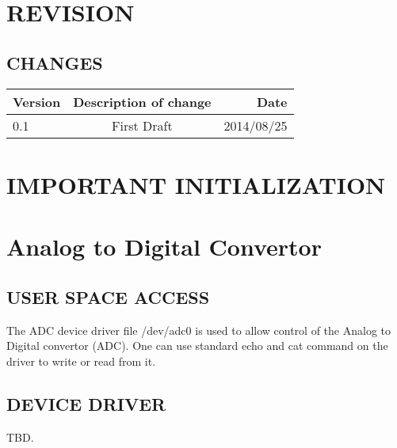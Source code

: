 \documentclass{book}
\title{}
\author{}
\begin{document}
\maketitle
\chapter{REVISION}
\section{CHANGES}
\begin{tabular}{| l | c | r |}
\hline
Version & Description of change & Date \\ \hline
0.1 & First Draft & 2014/08/25\\
\hline
\end{tabular}

\chapter{IMPORTANT INITIALIZATION}
 

\chapter{Analog to Digital Convertor}
\section{USER SPACE ACCESS}
The ADC device driver file /dev/adc0 is used to allow control of the Analog to Digital convertor (ADC). One can use standard echo and cat command on the driver to write or read from it. 

\section{DEVICE DRIVER}
TBD.
\end{document}
